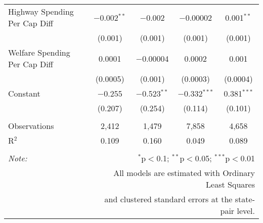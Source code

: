 \begin{table}[!htbp]
\begin{tabular}{@{\extracolsep{5pt}}lcccc}
  Highway Spending Per Cap Diff & $-$0.002$^{**}$ & $-$0.002 & $-$0.00002 & 0.001$^{**}$ \\ 
  & (0.001) & (0.001) & (0.001) & (0.001) \\ 
  Welfare Spending Per Cap Diff & 0.0001 & $-$0.00004 & 0.0002 & 0.001 \\ 
  & (0.0005) & (0.001) & (0.0003) & (0.0004) \\ 
  Constant & $-$0.255 & $-$0.523$^{**}$ & $-$0.332$^{***}$ & 0.381$^{***}$ \\ 
  & (0.207) & (0.254) & (0.114) & (0.101) \\ 
 \hline \\[-1.8ex] 
Observations & 2,412 & 1,479 & 7,858 & 4,658 \\ 
R$^{2}$ & 0.109 & 0.160 & 0.049 & 0.089 \\ 
\hline 
\hline \\[-1.8ex] 
\textit{Note:}  & \multicolumn{4}{r}{$^{*}$p$<$0.1; $^{**}$p$<$0.05; $^{***}$p$<$0.01} \\ 
 & \multicolumn{4}{r}{All models are estimated with Ordinary Least Squares} \\ 
 & \multicolumn{4}{r}{and clustered standard errors at the state-pair level.} \\ 
\end{tabular} 
\end{table} 
